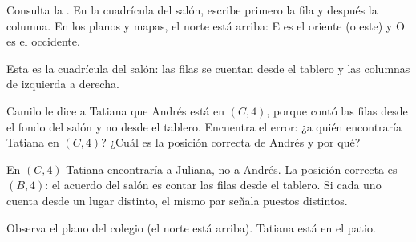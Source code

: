 \documentclass[11pt]{article}
\newcommand{\rosa}[1]{%
  \begin{scope}[shift={(#1)}, font=\scriptsize]
    \draw[->] (0,0) -- (0,0.6) node[above] {N};
    \draw (0,0) -- (0,-0.6) node[below] {S};
    \draw (0,0) -- (0.6,0) node[right] {E};
    \draw (0,0) -- (-0.6,0) node[left] {O};
  \end{scope}}
\newcommand{\lineas}[1]{\ifdefined\clave\else\renglones{#1}\fi}
\begin{document}
\encabezado

\begin{instrucciones}
Consulta la . En la cuadrícula del salón, escribe primero la fila y
después la columna. En los planos y mapas, el norte está arriba: E es el oriente (o este) y O
es el occidente.
\end{instrucciones}

\begin{preguntas}

\pregunta[1] Esta es la cuadrícula del salón: las filas se cuentan desde el tablero y las
columnas de izquierda a derecha.

\begin{center}
\end{center}

Camilo le dice a Tatiana que Andrés está en $(C, 4)$, porque contó las filas desde el fondo
del salón y no desde el tablero. Encuentra el error: ¿a quién encontraría Tatiana en
$(C, 4)$? ¿Cuál es la posición correcta de Andrés y por qué?
\begin{solucion}
En $(C, 4)$ Tatiana encontraría a Juliana, no a Andrés. La posición correcta es $(B, 4)$: el
acuerdo del salón es contar las filas desde el tablero. Si cada uno cuenta desde un lugar
distinto, el mismo par señala puestos distintos.
\end{solucion}
\lineas{3}

\pregunta[2] Observa el plano del colegio (el norte está arriba). Tatiana está en el patio.

\begin{center}
\end{center}


\end{preguntas}
\end{document}

